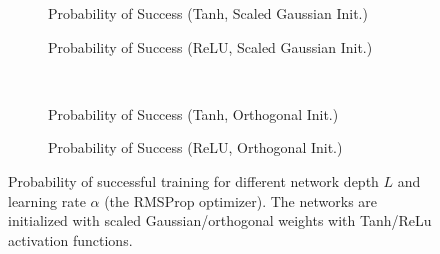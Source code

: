 \begin{figure}[h]
\centering
\newcommand{\myWidth}{0.4\textwidth}
\newcommand{\myspace}{\hspace{3mm}}
\begin{subfigure}{\myWidth}
  \centering
  \caption{Probability of Success (Tanh, Scaled Gaussian Init.)}
  \label{fig:mnist_rmsprop_s1}
\end{subfigure}\myspace%
\begin{subfigure}{\myWidth}
  \centering
  \caption{Probability of Success (ReLU, Scaled Gaussian Init.)}
  \label{fig:mnist_rmsprop_s2}
\end{subfigure}\myspace
\begin{subfigure}{8mm}
\end{subfigure}%
\\
\begin{subfigure}{\myWidth}
  \centering
  \caption{Probability of Success (Tanh, Orthogonal Init.)}
  \label{fig:mnist_rmsprop_s3}
\end{subfigure}\myspace
\begin{subfigure}{\myWidth}
  \centering
  \caption{Probability of Success (ReLU, Orthogonal Init.)}
  \label{fig:mnist_rmsprop_s4}
\end{subfigure}\myspace
\begin{subfigure}{8mm}
\end{subfigure}%
\caption[Probability of successful training for the RMSProp optimizer.]
{Probability of successful training for different network depth $L$ and learning rate $\alpha$ (the RMSProp optimizer).  The networks are initialized with scaled Gaussian/orthogonal weights with Tanh/ReLu activation functions.
}
\label{fig:mnist_rmsprop}
\end{figure}
